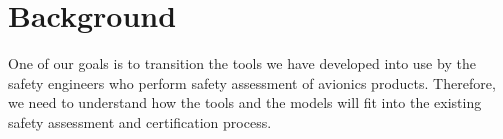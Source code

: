 \chapter{Background}
\label{chap:background}

One of our goals is to transition the tools we have developed into use by the safety engineers who perform safety assessment of avionics products. Therefore, we need to understand how the tools and the models will fit into the existing safety assessment and certification process. 


	

	
	
	